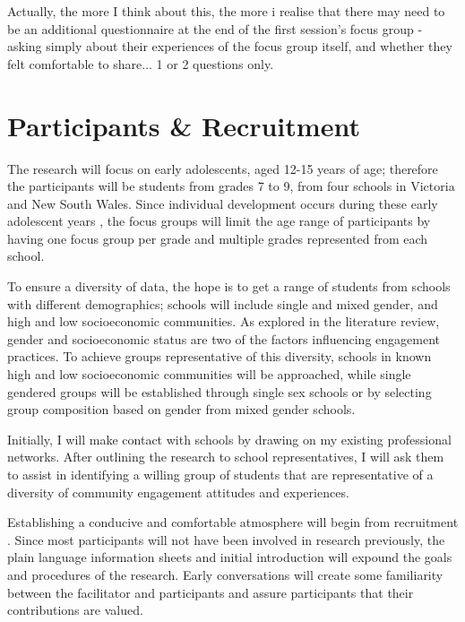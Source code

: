 Actually, the more I think about this, the more i realise that there may need to be an additional questionnaire at the end of the first session's focus group - asking simply about their experiences of the focus group itself, and whether they felt comfortable to share... 1 or 2 questions only. 


\section{Participants \& Recruitment}

The research will focus on early adolescents, aged 12-15 years of age; therefore the participants will be students from grades 7 to 9, from four schools in Victoria and New South Wales. Since individual development occurs during these early adolescent years \citep{Blakemore2012}, the focus groups will limit the age range of participants by having one focus group per grade and multiple grades represented from each school. 

To ensure a diversity of data, the hope is to get a range of students from schools with different demographics; schools will include single and mixed gender, and high and low socioeconomic communities. As explored in the literature review, gender and socioeconomic status are two of the factors influencing engagement practices. To achieve groups representative of this diversity, schools in known high and low socioeconomic communities will be approached, while single gendered groups will be established through single sex schools or by selecting group composition based on gender from mixed gender schools. 

Initially, I will make contact with schools by drawing on my existing professional networks. After outlining the research to school representatives, I will ask them to assist in identifying a willing group of students that are representative of a diversity of community engagement attitudes and experiences. %

Establishing a conducive and comfortable atmosphere will begin from recruitment \citep{Gibson2007}. Since most participants will not have been involved in research previously, the plain language information sheets and initial introduction will expound the goals and procedures of the research. Early conversations will create some familiarity between the facilitator and participants and assure participants that their contributions are valued. 

